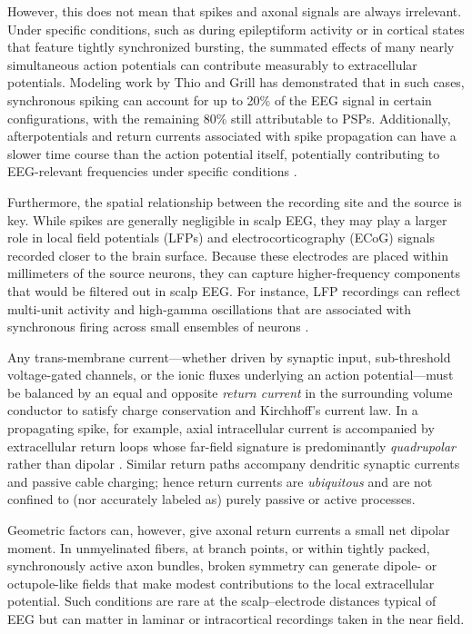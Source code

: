 \documentclass[final, a4paper,masters,en,listoffigures,listoftables,norwegiandates]{NMBU}
\begin{document}
However, this does not mean that spikes and axonal signals are always irrelevant. Under specific conditions, such as during epileptiform activity or in cortical states that feature tightly synchronized bursting, the summated effects of many nearly simultaneous action potentials can contribute measurably to extracellular potentials. Modeling work by Thio and Grill \cite{Thio2023} has demonstrated that in such cases, synchronous spiking can account for up to 20\% of the EEG signal in certain configurations, with the remaining 80\% still attributable to PSPs. Additionally, afterpotentials and return currents associated with spike propagation can have a slower time course than the action potential itself, potentially contributing to EEG-relevant frequencies under specific conditions \cite{ness2016subthreshold, Telenczuk2015}.

Furthermore, the spatial relationship between the recording site and the source is key. While spikes are generally negligible in scalp EEG, they may play a larger role in local field potentials (LFPs) and electrocorticography (ECoG) signals recorded closer to the brain surface. Because these electrodes are placed within millimeters of the source neurons, they can capture higher-frequency components that would be filtered out in scalp EEG. For instance, LFP recordings can reflect multi-unit activity and high-gamma oscillations that are associated with synchronous firing across small ensembles of neurons \cite{BIASIUCCI2019R80, Halnes2024ElectricBrainSignals}.

Any trans-membrane current—whether driven by synaptic input, sub-threshold voltage-gated channels, or the ionic fluxes underlying an action potential—must be balanced by an equal and opposite \emph{return current} in the surrounding volume conductor to satisfy charge conservation and Kirchhoff’s current law.  In a propagating spike, for example, axial intracellular current is accompanied by extracellular return loops whose far-field signature is predominantly \emph{quadrupolar} rather than dipolar \cite{Pettersen2008,Bedard2014}.  Similar return paths accompany dendritic synaptic currents and passive cable charging; hence return currents are \emph{ubiquitous} and are not confined to (nor accurately labeled as) purely passive or active processes.

Geometric factors can, however, give axonal return currents a small net dipolar moment.  In unmyelinated fibers, at branch points, or within tightly packed, synchronously active axon bundles, broken symmetry can generate dipole- or octupole-like fields that make modest contributions to the local extracellular potential.  Such conditions are rare at the scalp–electrode distances typical of EEG but can matter in laminar or intracortical recordings taken in the near field.
\end{document}
